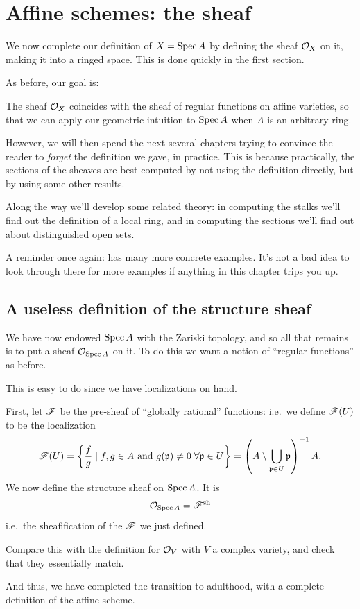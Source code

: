 \chapter{Affine schemes: the sheaf}
\label{ch:spec_sheaf}

We now complete our definition of $X = \operatorname{Spec} A$ by
defining the sheaf $\mathcal O_X$ on it, making it into a ringed space.
This is done quickly in the first section.

As before, our goal is:
\begin{moral}
	The sheaf $\mathcal O_X$ coincides with the sheaf of regular functions on
	affine varieties, so that we can apply our geometric intuition to $\operatorname{Spec} A$
	when $A$ is an arbitrary ring.
\end{moral}

However, we will then spend the next several chapters
trying to convince the reader to \emph{forget}
the definition we gave, in practice.
This is because practically,
the sections of the sheaves are best computed by not using
the definition directly, but by using some other results.

Along the way we'll develop some related theory:
in computing the stalks we'll find out the definition of a local ring,
and in computing the sections we'll find out about distinguished open sets.

A reminder once again:  has
many more concrete examples.
It's not a bad idea to look through there for more examples
if anything in this chapter trips you up.

\section{A useless definition of the structure sheaf}

We have now endowed $\operatorname{Spec} A$ with the Zariski topology,
and so all that remains is to put a sheaf $\mathcal O_{\operatorname{Spec} A}$ on it.
To do this we want a notion of ``regular functions'' as before.

This is easy to do since we have localizations on hand.
\begin{definition}
	First, let $\mathscr F$ be the pre-sheaf of ``globally rational'' functions:
	i.e.\ we define $\mathscr F(U)$ to be the localization
	\[
		\mathscr F(U) = \left\{
			\frac fg \mid f, g \in A
			\text{ and } g(\mathfrak p) \neq 0 \; \forall \mathfrak p \in U
		\right\}
		= \left(A \setminus \bigcup_{\mathfrak p \in U} \mathfrak p \right)^{-1} A.
	\]
	We now define the structure sheaf on $\operatorname{Spec} A$.
	It is
	\[ \mathcal O_{\operatorname{Spec} A} = \mathscr F^\mathrm{sh} \]
	i.e.\ the sheafification of the $\mathscr F$ we just defined.
\end{definition}
\begin{exercise}
	Compare this with the definition for $\mathcal O_V$
	with $V$ a complex variety, and check that they essentially match.
\end{exercise}
And thus, we have completed the transition to adulthood,
with a complete definition of the affine scheme.

